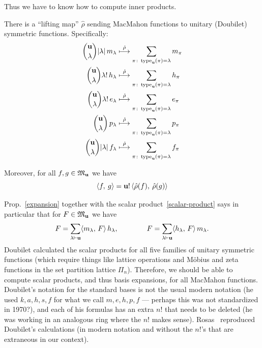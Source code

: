 Thus we have to know how to compute inner products.

There is a ``lifting map'' $\hat\rho$ \cite[Defn.~6]{Rosas} sending MacMahon functions to unitary (Doubilet) symmetric functions.  Specifically:
\begin{subequations}
\begin{align}
\binom{\mathbf{u}}{\lambda}|\lambda|\,m_\lambda &\overset{\hat\rho}{\longmapsto} \sum_{\pi\colon \operatorname{type}_{\mathbf{u}}(\pi)=\lambda} m_\pi \label{liftM}\\
\binom{\mathbf{u}}{\lambda}\lambda!\,h_\lambda &\overset{\hat\rho}{\longmapsto} \sum_{\pi\colon \operatorname{type}_{\mathbf{u}}(\pi)=\lambda} h_\pi\label{liftH}\\
\binom{\mathbf{u}}{\lambda}\lambda!\,e_\lambda &\overset{\hat\rho}{\longmapsto} \sum_{\pi\colon \operatorname{type}_{\mathbf{u}}(\pi)=\lambda} e_\pi\label{liftE}\\
\binom{\mathbf{u}}{\lambda}\,p_\lambda &\overset{\hat\rho}{\longmapsto} \sum_{\pi\colon \operatorname{type}_{\mathbf{u}}(\pi)=\lambda} p_\pi\label{liftP}\\
\binom{\mathbf{u}}{\lambda}|\lambda|\,f_\lambda &\overset{\hat\rho}{\longmapsto} \sum_{\pi\colon \operatorname{type}_{\mathbf{u}}(\pi)=\lambda} f_\pi\label{liftF}
\end{align}
\end{subequations}

Moreover, for all $f,g\in\mathfrak{M}_{\mathbf{u}}$ we have \cite[Prop.~7]{Rosas}
\begin{equation} \label{Rosas-scalar}
\left\langle f,\:g\right\rangle=\mathbf{u}!\left\langle \hat\rho(f),\:\hat\rho(g)\right\rangle
\end{equation}

Prop.~\ref{expansion} together with the scalar product~\eqref{scalar-product} says in particular that for $F\in\mathfrak{M}_{\mathbf{u}}$ we have
\begin{equation} \label{expand-HM}
F = \sum_{\lambda\vdash\mathbf{u}} \langle m_\lambda,\,F\rangle\, h_\lambda,
\qquad\qquad
F = \sum_{\lambda\vdash\mathbf{u}} \langle h_\lambda,\,F\rangle\, m_\lambda.
\end{equation}
Doubilet \cite[Appendix 2]{Doubilet} calculated the scalar products for all five families of unitary symmetric functions (which require things like lattice operations and  M\"obius and zeta functions in the set partition lattice $\Pi_n$).  Therefore, we should be able to compute scalar products, and thus basis expansions, for all MacMahon functions.   Doubilet's notation for the standard bases is not the usual modern notation (he used $k,a,h,s,f$ for what we call $m,e,h,p,f$ --- perhaps this was not standardized in 1970?), and each of his formulas has an extra $n!$ that needs to be deleted (he was working in an analogous ring where the $n!$ makes sense).  Rosas~\cite{Rosas} reproduced Doubilet's calculations (in modern notation and without the $n!$'s that are extraneous in our context).

